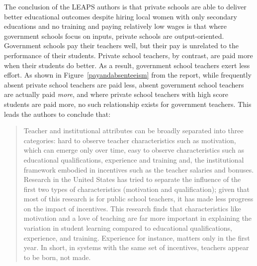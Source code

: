 \documentclass[12pt]{article}
\begin{document}
The conclusion of the LEAPS authors is that private schools are able to deliver better educational outcomes despite hiring local women with only secondary educations and no training and paying relatively low wages is that where government schools focus on inputs, private schools are output-oriented. Government schools pay their teachers well, but their pay is unrelated to the performance of their students. Private school teachers, by contrast, are paid more when their students do better. As a result, government school teachers exert less effort. As shown in Figure~\ref{payandabsenteeism} from the report, while frequently absent private school teachers are paid less, absent government school teachers are actually paid \emph{more}, and where private school teachers with high score students are paid more, no such relationship exists for government teachers. This leads the authors to conclude that:

\begin{quotation}
Teacher and institutional attributes can be broadly separated into three categories: hard to observe teacher characteristics such as motivation, which can emerge only over time, easy to observe characteristics such as educational qualifications, experience and training and, the institutional framework embodied in incentives such as the teacher salaries and bonuses. Research in the United States has tried to separate the influence of the first two types of characteristics (motivation and qualification); given that most of this research is for public school teachers, it has made less progress on the impact of incentives. This research finds that characteristics like motivation and a love of teaching are far more important in explaining the variation in student learning compared to educational qualifications, experience, and training. Experience for instance, matters only in the first year. In short, in systems with the same set of incentives, teachers appear to be born, not made.\citep[p. 78]{Andrabi:2007we}
\end{quotation}
\end{document}

